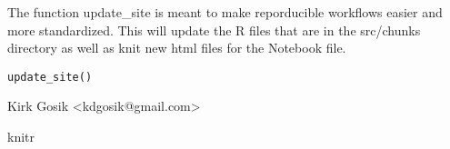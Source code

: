 \documentclass[letterpaper]{book}
\begin{document}
%
\begin{Description}\relax
The function update\_site is meant to make reporducible workflows easier and more standardized.  This will
update the R files that are in the src/chunks directory as well as knit new html files for the Notebook file.
\end{Description}
%
\begin{Usage}
\begin{verbatim}
update_site()
\end{verbatim}
\end{Usage}
%
\begin{Author}\relax
Kirk Gosik <kdgosik@gmail.com>
\end{Author}
%
\begin{SeeAlso}\relax
knitr
\end{SeeAlso}
\printindex{}
\end{document}
